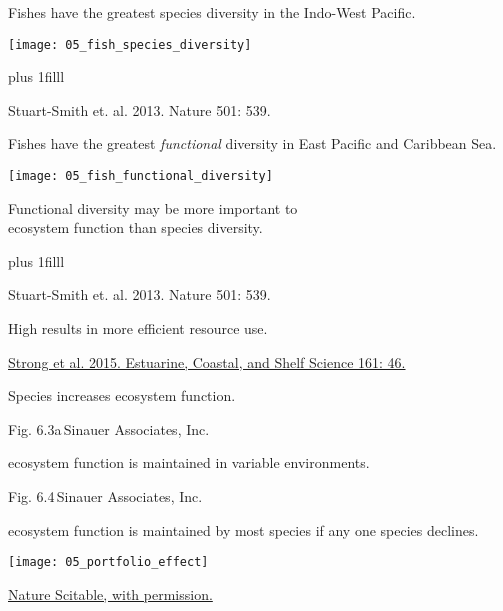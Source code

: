 \documentclass[t]{beamer}
\begin{document}
%
\begin{frame}[t]{Fishes have the greatest species diversity in the Indo-West Pacific.}

	\texttt{[image: 05\_fish\_species\_diversity]}
	
	\vskip0pt plus 1filll 
	
	\hfill\tiny Stuart-Smith et. al. 2013. Nature 501: 539.
	
\end{frame}
%
\begin{frame}[t]{Fishes have the greatest \emph{functional} diversity in East Pacific and Caribbean Sea.}

	\texttt{[image: 05\_fish\_functional\_diversity]}
	
	\vspace*{-0.5\baselineskip}
	
	\hangpara Functional diversity may be more important to \\ecosystem function than species diversity.
	
	\vskip0pt plus 1filll 
	
	\hfill\tiny Stuart-Smith et. al. 2013. Nature 501: 539.
\end{frame}
%
{
\begin{frame}[b]{High  results in more efficient resource use.}%

	\hfill\tiny \href{http://dx.doi.org/10.1016/j.ecss.2015.04.008}{Strong et al. 2015. Estuarine, Coastal, and Shelf Science 161: 46.}
\end{frame}
}
%
{
\begin{frame}[b]{Species  increases ecosystem function.}

\hfill \tiny Fig. 6.3a\,\textcopyright Sinauer Associates, Inc.
\end{frame}
}
%
{
\begin{frame}[b]{ ecosystem function is maintained in variable environments.}

\hfill\tiny Fig. 6.4\,\textcopyright Sinauer Associates, Inc.
\end{frame}
}
%
\begin{frame}[b]{ ecosystem function is maintained by most species if any one species declines.}

\centering
\texttt{[image: 05\_portfolio\_effect]}

\hfill\tiny \href{http://www.nature.com/scitable/knowledge/library/biodiversity-and-ecosystem-services-is-it-the-96677163}{\textcopyright Nature Scitable, with permission.}
\end{frame}
\end{document}
